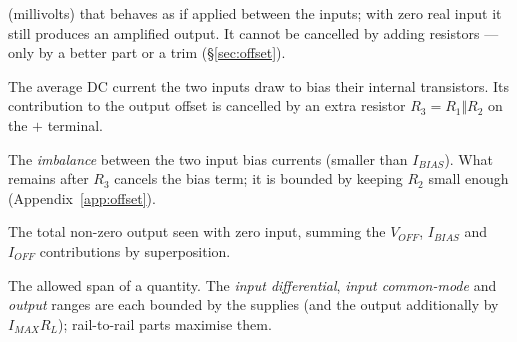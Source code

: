 \documentclass[11pt,a4paper,oneside]{book}
\begin{document}
\begin{description}[style=unboxed,leftmargin=0pt,itemsep=5pt,parsep=0pt,
        font=\normalfont\bfseries\color{accent!85!black}]
  (millivolts) that behaves as if applied between the inputs; with zero real input it
  still produces an amplified output. It cannot be cancelled by adding resistors ---
  only by a better part or a trim (\S\ref{sec:offset}).
\item[Input bias current $I_{BIAS}$.] The average DC current the two inputs draw to
  bias their internal transistors. Its contribution to the output offset is cancelled
  by an extra resistor $R_3=R_1\Vert R_2$ on the $+$ terminal.
\item[Input offset current $I_{\!OFF}$.] The \emph{imbalance} between the two input
  bias currents (smaller than $I_{BIAS}$). What remains after $R_3$ cancels the bias
  term; it is bounded by keeping $R_2$ small enough (Appendix~\ref{app:offset}).
\item[Output offset voltage.] The total non-zero output seen with zero input, summing
  the $V_{\!OFF}$, $I_{BIAS}$ and $I_{\!OFF}$ contributions by superposition.
\item[Dynamic range.] The allowed span of a quantity. The \emph{input differential},
  \emph{input common-mode} and \emph{output} ranges are each bounded by the supplies
  (and the output additionally by $I_{MAX}R_L$); rail-to-rail parts maximise them.
\end{description}
\end{document}
